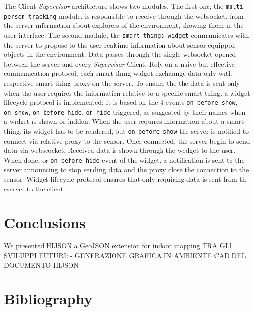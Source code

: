 \documentclass[]{article}
\begin{document}
The Client \emph{Supervisor} architecture shows two modules. The first
one, the \texttt{multi-person\ tracking} module, is responsible to
receive through the websocket, from the server information about
explorers of the environment, showing them in the user interface. The
second module, the \texttt{smart\ things\ widget} communicates with the
server to propose to the user realtime information about sensor-equipped
objects in the environment. Data passes through the single websocket
opened between the server and every \emph{Supervisor} Client. Rely on a
naive but effective communication protocol, each smart thing widget
exchaange data only with respective smart thing proxy on the server. To
ensure the the data is sent only when the user requires the information
relative to a specific smart thing, a widget lifecycle protocol is
implemented: it is based on the 4 events \texttt{on\_before\_show},
\texttt{on\_show}, \texttt{on\_before\_hide}, \texttt{on\_hide}
triggered, as suggested by their names when a widget is shown or hidden.
When the user requires information about a smart thing, its widget has
to be rendered, but \texttt{on\_before\_show} the server is notified to
connect via relative proxy to the sensor. Once connected, the server
begin to send data via webscocket. Received data is shown through the
wodget to the user. When done, or \texttt{on\_before\_hide} event of the
widget, a notification is sent to the server announcing to stop sending
data and the proxy close the connection to the sensor. Widget lifecycle
protocol ensures that only requiring data is sent from th eserver to the
client.

\section{Conclusions}\label{conclusions}

We presented HIJSON a GeoJSON extension for indoor mapping TRA GLI
SVILUPPI FUTURI: - GENERAZIONE GRAFICA IN AMBIENTE CAD DEL DOCUMENTO
HIJSON

\section{Bibliography}\label{bibliography}
\end{document}
